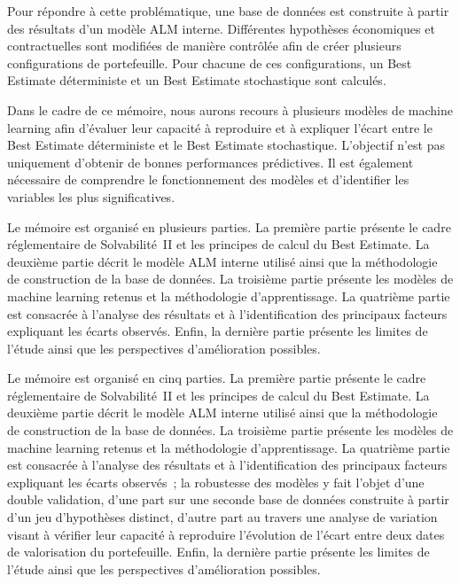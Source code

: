 Pour répondre à cette problématique, une base de données est construite à partir des résultats d'un modèle ALM interne. Différentes hypothèses économiques et contractuelles sont modifiées de manière contrôlée afin de créer plusieurs configurations de portefeuille. Pour chacune de ces configurations, un Best Estimate déterministe et un Best Estimate stochastique sont calculés.

Dans le cadre de ce mémoire, nous aurons recours à plusieurs modèles de machine learning afin d'évaluer leur capacité à reproduire et à expliquer l'écart entre le Best Estimate déterministe et le Best Estimate stochastique. L'objectif n'est pas uniquement d'obtenir de bonnes performances prédictives. Il est également nécessaire de comprendre le fonctionnement des modèles et d'identifier les variables les plus significatives.

Le mémoire est organisé en plusieurs parties. La première partie présente le cadre réglementaire de Solvabilité~II et les principes de calcul du Best Estimate. La deuxième partie décrit le modèle ALM interne utilisé ainsi que la méthodologie de construction de la base de données. La troisième partie présente les modèles de machine learning retenus et la méthodologie d'apprentissage. La quatrième partie est consacrée à l'analyse des résultats et à l'identification des principaux facteurs expliquant les écarts observés. Enfin, la dernière partie présente les limites de l'étude ainsi que les perspectives d'amélioration possibles.


Le mémoire est organisé en cinq parties. La première partie présente le cadre réglementaire de
Solvabilité~II et les principes de calcul du Best Estimate. La deuxième partie décrit le modèle ALM
interne utilisé ainsi que la méthodologie de construction de la base de données. La troisième partie
présente les modèles de machine learning retenus et la méthodologie d'apprentissage. La quatrième
partie est consacrée à l'analyse des résultats et à l'identification des principaux facteurs expliquant
les écarts observés~; la robustesse des modèles y fait l'objet d'une double validation, d'une part sur
une seconde base de données construite à partir d'un jeu d'hypothèses distinct, d'autre part au
travers une analyse de variation visant à vérifier leur capacité à reproduire l'évolution de l'écart
entre deux dates de valorisation du portefeuille. Enfin, la dernière partie présente les limites de l'étude
ainsi que les perspectives d'amélioration possibles.